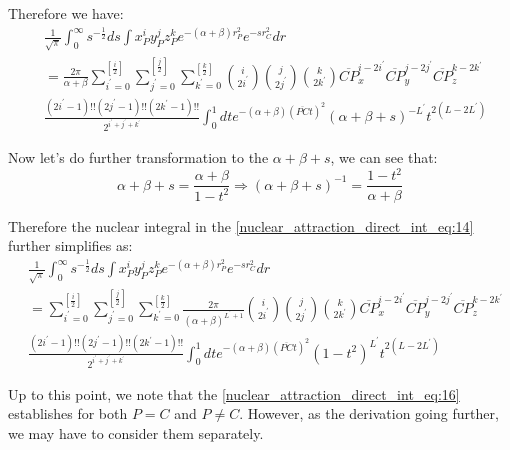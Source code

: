 Therefore we have:
\begin{equation}
 \label{nuclear_attraction_direct_int_eq:14}
\begin{split}
&\frac{1}{\sqrt{\pi}} 
 \int^{\infty}_{0} s^{-\frac{1}{2}} ds 
 \int x_{P}^{i}y_{P}^{j}z_{P}^{k} e^{-(\alpha+\beta)r_{P}^{2}}e^{-sr_{C}^{2}} dr \\
&= 
\frac{2\pi}{\alpha+\beta}
\sum_{i^{'}=0}^{\left[ \frac{i}{2}\right]}
\sum_{j^{'}=0}^{\left[ \frac{j}{2}\right]}
\sum_{k^{'}=0}^{\left[ \frac{k}{2}\right]} 
\binom{i}{2i^{'}}\binom{j}{2j^{'}}\binom{k}{2k^{'}}
\overline{CP}_{x}^{i-2i^{'}}\overline{CP}_{y}^{j-2j^{'}}\overline{CP}_{z}^{k-2k^{'}} \\
&\frac{(2i^{'}-1)!!(2j^{'}-1)!!(2k^{'}-1)!!}{2^{i^{'}+j^{'}+k^{'}}} 
\int^{1}_{0} dt
e^{-(\alpha+\beta)(\overline{PC}t)^{2}}
(\alpha+\beta+s)^{-L^{'} }t^{2(L-2L^{'})} 
\end{split}
\end{equation}

Now let's do further transformation to the $\alpha+\beta+s$, we can see that:
\begin{equation}
 \label{nuclear_attraction_direct_int_eq:15}
\alpha+\beta+s = \frac{\alpha+\beta}{1-t^{2}} \Rightarrow (\alpha+\beta+s)^{-1} = 
\frac{1-t^{2}}{\alpha+\beta}
\end{equation}

Therefore the nuclear integral in the \ref{nuclear_attraction_direct_int_eq:14}
further simplifies as:
\begin{equation}
\begin{split}
&\frac{1}{\sqrt{\pi}} 
 \int^{\infty}_{0} s^{-\frac{1}{2}} ds 
 \int x_{P}^{i}y_{P}^{j}z_{P}^{k} e^{-(\alpha+\beta)r_{P}^{2}}e^{-sr_{C}^{2}} dr \\
&= 
\sum_{i^{'}=0}^{\left[ \frac{i}{2}\right]}
\sum_{j^{'}=0}^{\left[ \frac{j}{2}\right]}
\sum_{k^{'}=0}^{\left[ \frac{k}{2}\right]} 
\frac{2\pi}{(\alpha+\beta)^{L^{'}+1}}
\binom{i}{2i^{'}}\binom{j}{2j^{'}}\binom{k}{2k^{'}}
\overline{CP}_{x}^{i-2i^{'}}\overline{CP}_{y}^{j-2j^{'}}\overline{CP}_{z}^{k-2k^{'}} \\
&\frac{(2i^{'}-1)!!(2j^{'}-1)!!(2k^{'}-1)!!}{2^{i^{'}+j^{'}+k^{'}}} 
\int^{1}_{0} dt
e^{-(\alpha+\beta)(\overline{PC}t)^{2}}
(1-t^{2})^{L^{'} }t^{2(L-2L^{'})} 
\end{split}
\label{nuclear_attraction_direct_int_eq:16}
\end{equation}

Up to this point, we note that the \ref{nuclear_attraction_direct_int_eq:16} establishes for both
$P = C$ and $P \neq C$. However, as the derivation going further, we may have to consider them
separately.

